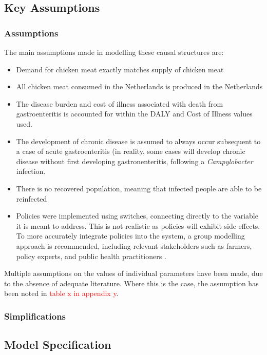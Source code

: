 \subsection{Key Assumptions}
\label{s:assumptions}
\subsubsection{Assumptions}
The main assumptions made in modelling these causal structures are:
\begin{itemize}
    \item Demand for chicken meat exactly matches supply of chicken meat
    \item All chicken meat consumed in the Netherlands is produced in the Netherlands
    \item The disease burden and cost of illness associated with death from gastroenteritis is accounted for within the DALY and Cost of Illness values used.
    \item The development of chronic disease is assumed to always occur subsequent to a case of acute gastroenteritis (in reality, some cases will develop chronic disease without first developing gastronenteritis, following a \textit{Campylobacter} infection.
    \item There is no recovered population, meaning that infected people are able to be reinfected
    \item Policies were implemented using switches, connecting directly to the variable it is meant to address. This is not realistic as policies will exhibit side effects. To more accurately integrate policies into the system,  a group modelling approach is recommended, including relevant stakeholders such as farmers, policy experts, and public health practitioners \parencite{vennix_group_1999}.
\end{itemize}

Multiple assumptions on the values of individual parameters have been made, due to the absence of adequate literature. Where this is the case, the assumption has been noted in \textcolor{red}{table x in appendix y}.
\subsubsection{Simplifications}

\subsection{Model Specification}
